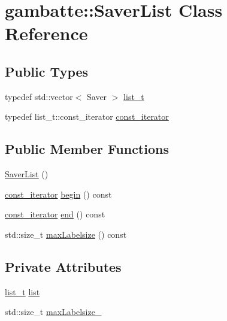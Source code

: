 \hypertarget{classgambatte_1_1SaverList}{}\section{gambatte\+:\+:Saver\+List Class Reference}
\label{classgambatte_1_1SaverList}
\subsection*{Public Types}
\begin{DoxyCompactItemize}
\item 
typedef std\+::vector$<$ Saver $>$ \hyperlink{classgambatte_1_1SaverList_aa91497bbdb2dbc6c3f44a45e26a9f835}{list\+\_\+t}
\item 
typedef list\+\_\+t\+::const\+\_\+iterator \hyperlink{classgambatte_1_1SaverList_a6c4bcf85cbbff11fb4a7e01f64c55631}{const\+\_\+iterator}
\end{DoxyCompactItemize}
\subsection*{Public Member Functions}
\begin{DoxyCompactItemize}
\item 
\hyperlink{classgambatte_1_1SaverList_aeca1a0960b562e908dab883411e8f8e4}{Saver\+List} ()
\item 
\hyperlink{classgambatte_1_1SaverList_a6c4bcf85cbbff11fb4a7e01f64c55631}{const\+\_\+iterator} \hyperlink{classgambatte_1_1SaverList_a42e8fc9e06ed110c54876038b9af8a1b}{begin} () const
\item 
\hyperlink{classgambatte_1_1SaverList_a6c4bcf85cbbff11fb4a7e01f64c55631}{const\+\_\+iterator} \hyperlink{classgambatte_1_1SaverList_ab7c2912d5252aab65666cef9290e6b84}{end} () const
\item 
std\+::size\+\_\+t \hyperlink{classgambatte_1_1SaverList_a3016ee3e53b04df7949e7696dba399eb}{max\+Labelsize} () const
\end{DoxyCompactItemize}
\subsection*{Private Attributes}
\begin{DoxyCompactItemize}
\item 
\hyperlink{classgambatte_1_1SaverList_aa91497bbdb2dbc6c3f44a45e26a9f835}{list\+\_\+t} \hyperlink{classgambatte_1_1SaverList_af9e4e053e36847ef9e87441900135c09}{list}
\item 
std\+::size\+\_\+t \hyperlink{classgambatte_1_1SaverList_a5909f25db602678444f8344826bf7628}{max\+Labelsize\+\_\+}
\end{DoxyCompactItemize}


